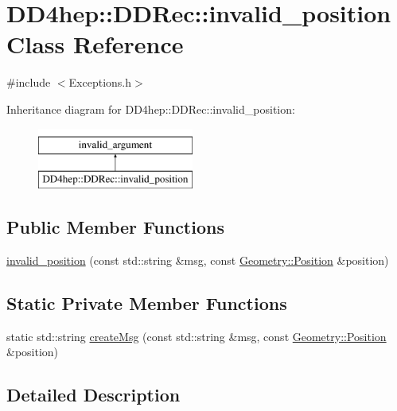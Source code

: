 \hypertarget{class_d_d4hep_1_1_d_d_rec_1_1invalid__position}{}\section{D\+D4hep\+:\+:D\+D\+Rec\+:\+:invalid\+\_\+position Class Reference}
\label{class_d_d4hep_1_1_d_d_rec_1_1invalid__position}


{\ttfamily \#include $<$Exceptions.\+h$>$}

Inheritance diagram for D\+D4hep\+:\+:D\+D\+Rec\+:\+:invalid\+\_\+position\+:\begin{figure}[H]
\begin{center}
\leavevmode
\includegraphics[height=2.000000cm]{class_d_d4hep_1_1_d_d_rec_1_1invalid__position}
\end{center}
\end{figure}
\subsection*{Public Member Functions}
\begin{DoxyCompactItemize}
\item 
\hyperlink{class_d_d4hep_1_1_d_d_rec_1_1invalid__position_aa71858d5b379311e9530ceabc0f99455}{invalid\+\_\+position} (const std\+::string \&msg, const \hyperlink{namespace_d_d4hep_1_1_geometry_a55083902099d03506c6db01b80404900}{Geometry\+::\+Position} \&position)
\end{DoxyCompactItemize}
\subsection*{Static Private Member Functions}
\begin{DoxyCompactItemize}
\item 
static std\+::string \hyperlink{class_d_d4hep_1_1_d_d_rec_1_1invalid__position_af04d48b510823d5fd98ebb75a1ed52c0}{create\+Msg} (const std\+::string \&msg, const \hyperlink{namespace_d_d4hep_1_1_geometry_a55083902099d03506c6db01b80404900}{Geometry\+::\+Position} \&position)
\end{DoxyCompactItemize}


\subsection{Detailed Description}



